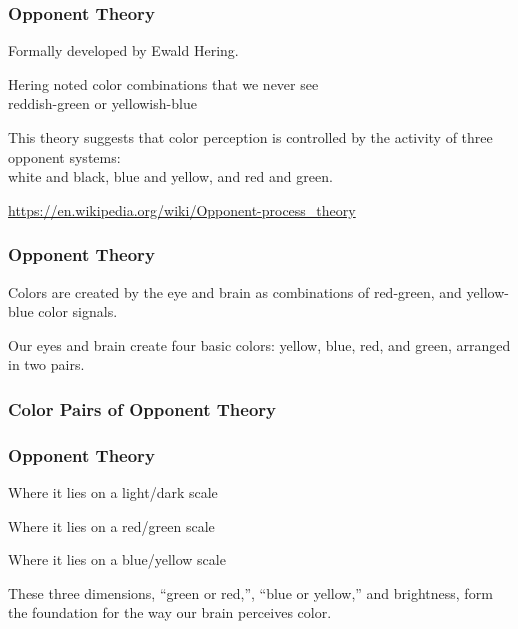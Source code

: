 \documentclass[12pt]{beamer}\usepackage[]{graphicx}\usepackage[]{color}
\begin{document}
\begin{frame}
\frametitle{Opponent Theory}

\bbi
  \item Formally developed by Ewald Hering.
  \item Hering noted color combinations that we never see \\
  {\lolit reddish-green or yellowish-blue}
  \item This theory suggests that color perception is controlled by the 
  activity of three opponent systems: \\
  white and black, blue and yellow, and red and green.
  \item {\scriptsize \url{https://en.wikipedia.org/wiki/Opponent-process_theory}}
\ei
\eb

\end{frame}


\begin{frame}
\frametitle{Opponent Theory}

Colors are created by the eye and brain as combinations of red-green, and 
yellow-blue color signals.
\eb

Our eyes and brain create four basic colors: yellow, blue, red, and green, 
arranged in two pairs.
\eb

\end{frame}


\begin{frame}
\frametitle{Color Pairs of Opponent Theory}
\begin{center}
\end{center}
\end{frame}


\begin{frame}
\frametitle{Opponent Theory}

\bbi
  \item Where it lies on a light/dark scale
  \item Where it lies on a red/green scale
  \item Where it lies on a blue/yellow scale
\ei
\eb

These three dimensions, ``green or red,'', ``blue or yellow,'' and 
brightness, form the foundation for the way our brain perceives color.

\end{frame}
\end{document}
